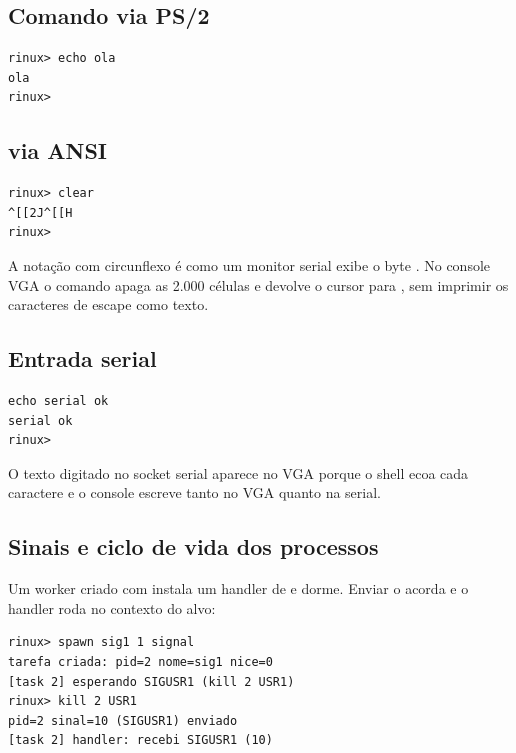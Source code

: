 \subsection{Comando  via PS/2}

\begin{lstlisting}[style=shell,caption={Sa\'ida de \code{echo ola} ap\'os entrada PS/2.},label={lst:testecho}]
rinux> echo ola
ola
rinux>
\end{lstlisting}

\subsection{ via ANSI}

\begin{lstlisting}[style=shell,caption={Sequ\^encia de escape observada na COM1.},label={lst:testclear}]
rinux> clear
^[[2J^[[H
rinux>
\end{lstlisting}

A nota\c{c}\~ao com circunflexo \'e como um monitor serial exibe o byte
. No console VGA o comando apaga as 2.000 c\'elulas e devolve o
cursor para , sem imprimir os caracteres de escape como texto.

\subsection{Entrada serial}

\begin{lstlisting}[style=shell,caption={Entrada e sa\'ida pela COM1.},label={lst:testserial}]
echo serial ok
serial ok
rinux>
\end{lstlisting}

O texto digitado no socket serial aparece no VGA porque o shell ecoa cada
caractere e o console escreve tanto no VGA quanto na serial.

\subsection{Sinais e ciclo de vida dos processos}

Um worker criado com  instala um handler de
 e dorme. Enviar  o acorda e o handler roda no
contexto do alvo:

\begin{lstlisting}[style=shell,caption={Handler de sinal personalizado.},label={lst:testsignalpt}]
rinux> spawn sig1 1 signal
tarefa criada: pid=2 nome=sig1 nice=0
[task 2] esperando SIGUSR1 (kill 2 USR1)
rinux> kill 2 USR1
pid=2 sinal=10 (SIGUSR1) enviado
[task 2] handler: recebi SIGUSR1 (10)
\end{lstlisting}

